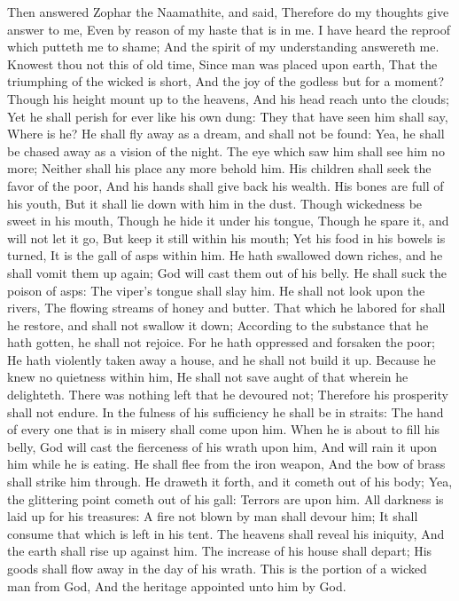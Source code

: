 Then answered Zophar the Naamathite, and said,  Therefore do my thoughts give answer to me, Even by reason of my haste that is in me.  I have heard the reproof which putteth me to shame; And the spirit of my understanding answereth me.  Knowest thou not this of old time, Since man was placed upon earth,  That the triumphing of the wicked is short, And the joy of the godless but for a moment?  Though his height mount up to the heavens, And his head reach unto the clouds;  Yet he shall perish for ever like his own dung: They that have seen him shall say, Where is he?  He shall fly away as a dream, and shall not be found: Yea, he shall be chased away as a vision of the night.  The eye which saw him shall see him no more; Neither shall his place any more behold him.  His children shall seek the favor of the poor, And his hands shall give back his wealth.  His bones are full of his youth, But it shall lie down with him in the dust.  Though wickedness be sweet in his mouth, Though he hide it under his tongue,  Though he spare it, and will not let it go, But keep it still within his mouth;  Yet his food in his bowels is turned, It is the gall of asps within him.  He hath swallowed down riches, and he shall vomit them up again; God will cast them out of his belly.  He shall suck the poison of asps: The viper’s tongue shall slay him.  He shall not look upon the rivers, The flowing streams of honey and butter.  That which he labored for shall he restore, and shall not swallow it down; According to the substance that he hath gotten, he shall not rejoice.  For he hath oppressed and forsaken the poor; He hath violently taken away a house, and he shall not build it up.  Because he knew no quietness within him, He shall not save aught of that wherein he delighteth.  There was nothing left that he devoured not; Therefore his prosperity shall not endure.  In the fulness of his sufficiency he shall be in straits: The hand of every one that is in misery shall come upon him.  When he is about to fill his belly, God will cast the fierceness of his wrath upon him, And will rain it upon him while he is eating.  He shall flee from the iron weapon, And the bow of brass shall strike him through.  He draweth it forth, and it cometh out of his body; Yea, the glittering point cometh out of his gall: Terrors are upon him.  All darkness is laid up for his treasures: A fire not blown by man shall devour him; It shall consume that which is left in his tent.  The heavens shall reveal his iniquity, And the earth shall rise up against him.  The increase of his house shall depart; His goods shall flow away in the day of his wrath.  This is the portion of a wicked man from God, And the heritage appointed unto him by God. 

